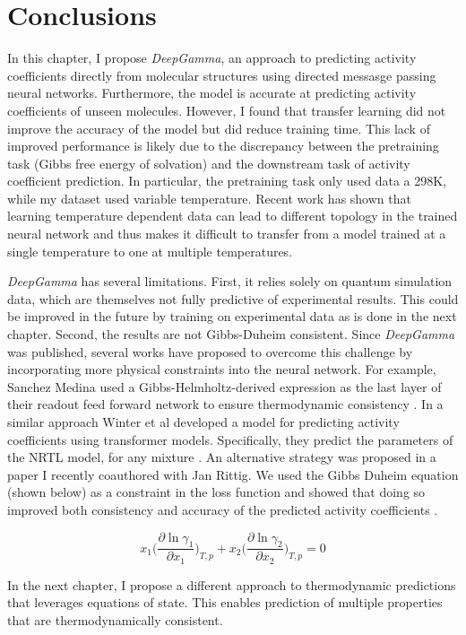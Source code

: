 \section{Conclusions}

In this chapter, I propose \textit{DeepGamma}, an approach to predicting activity coefficients directly from molecular structures using directed messasge passing neural networks. Furthermore, the model is accurate at predicting activity coefficients of unseen molecules. However, I found that transfer learning did not improve the accuracy of the model but did reduce training time. This lack of improved performance is likely due to the discrepancy between the pretraining task (Gibbs free energy of solvation) and the downstream task of activity coefficient prediction. In particular, the pretraining task only used data a 298K, while my dataset used variable temperature. Recent work \cite{Lansford2023} has shown that learning temperature dependent data can lead to different topology in the trained neural network and thus makes it difficult to transfer from a model trained at a single temperature to one at multiple temperatures.

\textit{DeepGamma} has several limitations. First,  it relies solely on quantum simulation data, which are themselves not fully predictive of experimental results. This could be improved in the future by training on experimental data as is done in the next chapter. Second, the results are not Gibbs-Duheim  consistent. Since \textit{DeepGamma} was published, several works have proposed to overcome this challenge by incorporating more physical constraints into the neural network. For example, Sanchez Medina used  a Gibbs-Helmholtz-derived expression as the last layer of their readout feed forward network to ensure thermodynamic consistency \cite{SanchezMedina2023}. In a similar approach Winter et al developed a model for predicting activity coefficients using transformer models. Specifically, they predict the parameters of the NRTL model, for any mixture \cite{Winter2022}. An alternative strategy was proposed in a paper I recently coauthored with Jan Rittig. We used the Gibbs Duheim equation (shown below) as a constraint in the loss function and showed that doing so improved both consistency and accuracy of the predicted activity coefficients \cite{Rittig2023b}.

\begin{equation}
    x_1 \biggl (\frac{\partial \ln \gamma_1}{\partial x_1}\biggr)_{T,p} + x_2 \biggl (\frac{\partial \ln \gamma_2}{\partial x_2}\biggr)_{T,p} = 0
\end{equation}

In the next chapter, I propose a different approach to thermodynamic predictions that leverages equations of state. This enables prediction of multiple properties that are thermodynamically consistent.

